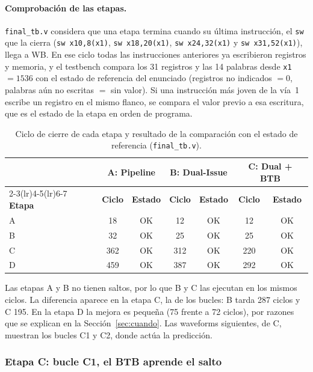 \documentclass[12pt,a4paper]{article}
\begin{document}
\paragraph{Comprobación de las etapas.} \texttt{final\_tb.v} considera que una etapa termina cuando su última instrucción, el \texttt{sw} que la cierra (\texttt{sw x10,8(x1)}, \texttt{sw x18,20(x1)}, \texttt{sw x24,32(x1)} y \texttt{sw x31,52(x1)}), llega a WB. En ese ciclo todas las instrucciones anteriores ya escribieron registros y memoria, y el testbench compara los 31 registros y las 14 palabras desde \texttt{x1}$=1536$ con el estado de referencia del enunciado (registros no indicados $= 0$, palabras aún no escritas $=$ sin valor). Si una instrucción más joven de la vía~1 escribe un registro en el mismo flanco, se compara el valor previo a esa escritura, que es el estado de la etapa en orden de programa.

\begin{table}[H]
\centering
\small
\begin{tabular}{lcccccc}
\toprule
& \multicolumn{2}{c}{\textbf{A: Pipeline}} & \multicolumn{2}{c}{\textbf{B: Dual-Issue}} & \multicolumn{2}{c}{\textbf{C: Dual + BTB}} \\
\cmidrule(lr){2-3}\cmidrule(lr){4-5}\cmidrule(lr){6-7}
\textbf{Etapa} & \textbf{Ciclo} & \textbf{Estado} & \textbf{Ciclo} & \textbf{Estado} & \textbf{Ciclo} & \textbf{Estado} \\
\midrule
A & 18  & OK & 12  & OK & 12  & OK \\
B & 32  & OK & 25  & OK & 25  & OK \\
C & 362 & OK & 312 & OK & 220 & OK \\
D & 459 & OK & 387 & OK & 292 & OK \\
\bottomrule
\end{tabular}
\caption{Ciclo de cierre de cada etapa y resultado de la comparación con el estado de referencia (\texttt{final\_tb.v}).}
\label{tab:etapas}
\end{table}

Las etapas A y B no tienen saltos, por lo que B y C las ejecutan en los mismos ciclos. La diferencia aparece en la etapa C, la de los bucles: B tarda 287 ciclos y C 195. En la etapa D la mejora es pequeña (75 frente a 72 ciclos), por razones que se explican en la Sección~\ref{sec:cuando}. Las waveforms siguientes, de C, muestran los bucles C1 y C2, donde actúa la predicción.

\subsubsection{Etapa C: bucle C1, el BTB aprende el salto}
\end{document}
